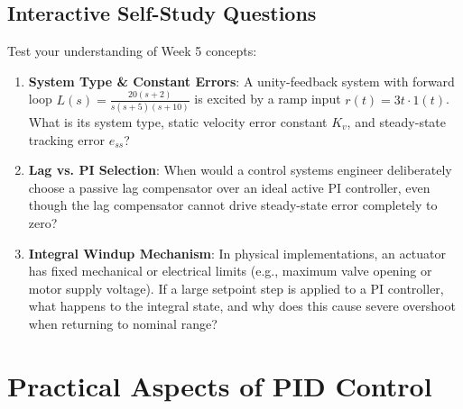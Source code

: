 \documentclass[12pt,onecolumn,twoside ]{article}
\begin{document}
	\subsection{Interactive Self-Study Questions}
	Test your understanding of Week 5 concepts:
	\begin{enumerate}
		\item
		\textbf{System Type \& Constant Errors}: A unity-feedback system with forward loop $L(s) = \frac{20(s+2)}{s(s+5)(s+10)}$ is excited by a ramp input $r(t) = 3t \cdot 1(t)$. What is its system type, static velocity error constant $K_v$, and steady-state tracking error $e_{ss}$?
		\item
		\textbf{Lag vs. PI Selection}: When would a control systems engineer deliberately choose a passive lag compensator over an ideal active PI controller, even though the lag compensator cannot drive steady-state error completely to zero?
		\item
		\textbf{Integral Windup Mechanism}: In physical implementations, an actuator has fixed mechanical or electrical limits (e.g., maximum valve opening or motor supply voltage). If a large setpoint step is applied to a PI controller, what happens to the integral state, and why does this cause severe overshoot when returning to nominal range?
	\end{enumerate}
	
	\newpage
	\section{Practical Aspects of PID Control}

	
\end{document}
